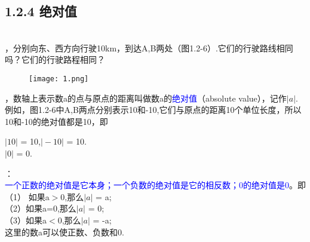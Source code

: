 \documentclass[UTF8]{article}
\begin{document}
	\subsection*{ 1.2.4 绝对值}\\
	，分别向东、西方向行驶10km，到达A,B两处（图1.2-6）.它们的行驶路线相同吗？它们的行驶路程相同？\\
	\begin{figure}[ht]
		\centering
		\texttt{[image: 1.png]}
	\end{figure}

	\begin{defintion}
	，数轴上表示数a的点与原点的距离叫做数a的\textcolor{blue}{绝对值}（absolute value），记作$\vert a \vert$.例如，图1.2-6中A,B两点分别表示10和-10,它们与原点的距离10个单位长度，所以10和-10的绝对值都是10，即\\
	\end{defintion}
	\indent$\vert 10 \vert$ = 10,$\vert -10 \vert$ = 10.\\
	$\vert 0 \vert$ = 0.\\
	
	\begin{propertory}
	：\\
	\indent\textcolor{blue}{一个正数的绝对值是它本身；一个负数的绝对值是它的相反数；0的绝对值是0}。即\\
	\indent（1） 如果a$>$0,那么$\vert a \vert$ = a;\\
	\indent（2）如果a=0,那么$\vert a \vert$ = 0;\\
	\indent（3）如果a$<$0,那么$\vert a \vert$ = -a;\\
	\indent 这里的数a可以使正数、负数和0.\\
	\end{propertory}
	
\end{document}
